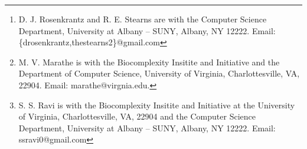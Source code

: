 \documentclass[10pt,journal,compsoc]{IEEEtran}
\begin{document}
\iffalse
\author{Daniel J. Rosenkrantz,~\IEEEmembership{}
        Madhav V. Marathe,~\IEEEmembership{Fellow,~IEEE,}
        S. S. Ravi,~\IEEEmembership{}
        and~Richard E. Stearns,~\IEEEmembership{}%
\IEEEcompsocitemizethanks{
\IEEEcompsocthanksitem D. J. Rosenkrantz is with the Department
of Computer Science, University at Albany -- SUNY, Albany, NY, 12222.\protect\\
E-mail: drosenkrantz@gmail.com
\IEEEcompsocthanksitem M. V. Marathe is with the Biocomplexity Institute \& Initiative
and the Department of Computer Science at the  University of Virginia, Charlottesville,
VA, 22904.\protect\\ E-mail: marathe@virginia.edu
\IEEEcompsocthanksitem S. S. Ravi is with the Biocomplexity Institute \& Initiative
at the  University of Virginia, Charlottesville,
VA, 22904 and the Department of Computer Science, University at Albany -- SUNY,
Albany, NY, 12222.\protect\\ E-mail: ssravi0@gmail.com
\IEEEcompsocthanksitem R. E. Stearns is with the Department
of Computer Science, University at Albany -- SUNY, Albany, NY, 12222.\protect\\
E-mail: thestearns2@gmail.com
}
}%
\fi
\author{Daniel J. Rosenkrantz,~ Madhav V. Marathe,~ S.~S. Ravi~ and~
        Richard E. Stearns%
   \thanks{D. J. Rosenkrantz and R. E. Stearns are with the Computer
           Science Department, University at Albany -- SUNY, Albany,
           NY 12222. Email: \{drosenkrantz,thestearns2\}@gmail.com}
   \thanks{M. V. Marathe is with the Biocomplexity Insitite and Initiative
           and the Department of Computer Science, University of Virginia,
           Charlottesville, VA, 22904. Email: marathe@virgnia.edu.}
   \thanks{S. S. Ravi is with the Biocomplexity Insitite and Initiative
           at the University of Virginia,
           Charlottesville, VA, 22904 and the Computer
           Science Department, University at Albany -- SUNY, Albany, NY 12222.
           Email: ssravi0@gmail.com}
}
\maketitle
\end{document}
